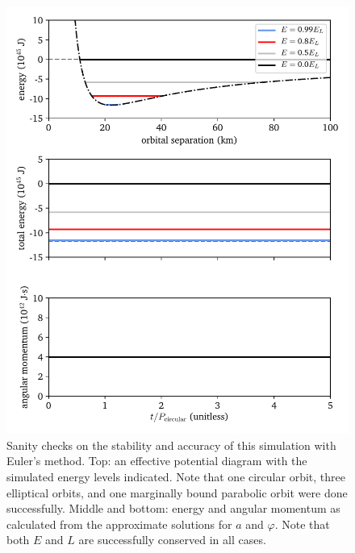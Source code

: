 \documentclass[11pt]{article}
\begin{document}
\begin{figure}[!h]
\centering
\includegraphics[scale=1]{keplerian_orbit/sanity_checks.pdf}
\caption{\label{fig:sanity_checks} Sanity checks on the stability and accuracy of this simulation with Euler's method. Top: an effective potential diagram with the simulated energy levels indicated. Note that one circular orbit, three elliptical orbits, and one marginally bound parabolic orbit were done successfully. Middle and bottom: energy and angular momentum as calculated from the approximate solutions for $a$ and $\varphi$. Note that both $E$ and $L$ are successfully conserved in all cases.}
\end{figure}
\end{document}
